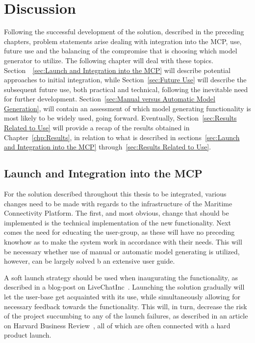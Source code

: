 \chapter{Discussion}
Following the successful development of the solution, described in the preceding chapters, problem statements arise dealing with integration into the MCP, use, future use and the balancing of the compromise that is choosing which model generator to utilize. The following chapter will deal with these topics. Section ~\ref{sec:Launch and Integration into the MCP} will describe potential approaches to initial integration, while Section~\ref{sec:Future Use} will describe the subsequent future use, both practical and technical, following the inevitable need for further development. Section~\ref{sec:Manual versus Automatic Model Generation}, will contain an assessment of which model generating functionality is most likely to be widely used, going forward. Eventually, Section~\ref{sec:Results Related to Use} will provide a recap of the results obtained in Chapter~\ref{chp:Results}, in relation to what is described in sections~\ref{sec:Launch and Integration into the MCP} through~\ref{sec:Results Related to Use}.

\section{Launch and Integration into the MCP}
For the solution described throughout this thesis to be integrated, various changes need to be made with regards to the infrastructure of the Maritime Connectivity Platform. The first, and most obvious, change that should be implemented is the technical implementation of the new functionality. Next comes the need for educating the user-group, as these will have no preceding knowhow as to make the system work in accordance with their needs. This will be necessary whether use of manual or automatic model generating is utilized, however, can be largely solved b an extensive user guide.

A soft launch strategy should be used when inaugurating the functionality, as described in a blog-post on LiveChatInc~\cite{hardoSoft}. Launching the solution gradually will let the user-base get acquainted with its use, while simultaneously allowing for necessary feedback towards the functionality. This will, in turn, decrease the risk of the project succumbing to any of the launch failures, as described in an article on Harvard Business Review~\cite{hbr}, all of which are often connected with a hard product launch.
